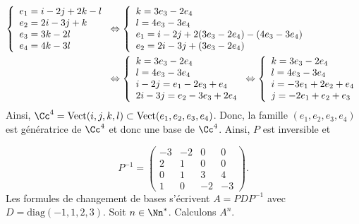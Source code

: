 {\begin{enumerate}
{\begin{align*}\ensuremath
\left\{
\begin{array}{l}
e_1=i-2j+2k-l\\
e_2=2i-3j+k\\
e_3=3k-2l\\
e_4=4k-3l
\end{array}
\right.
&\Leftrightarrow
\left\{
\begin{array}{l}
k=3e_3-2e_4\\
l=4e_3-3e_4\\
e_1=i-2j+2(3e_3-2e_4)-(4e_3-3e_4)\\
e_2=2i-3j+(3e_3-2e_4)
\end{array}
\right.
\\
 &\Leftrightarrow
\left\{
\begin{array}{l}
k=3e_3-2e_4\\
l=4e_3-3e_4\\
i-2j=e_1-2e_3+e_4\\
2i-3j=e_2-3e_3+2e_4
\end{array}
\right.\Leftrightarrow
\left\{
\begin{array}{l}
k=3e_3-2e_4\\
l=4e_3-3e_4\\
i=-3e_1+2e_2+e_4\\
j=-2e_1+e_2+e_3
\end{array}
\right.
\end{align*}
Ainsi, $\Cc^4=\mbox{Vect}(i,j,k,l)\subset\mbox{Vect}(e_1,e_2,e_3,e_4)$. Donc, la famille $(e_1,e_2,e_3,e_4)$ est génératrice de $\Cc^4$ et donc une base de $\Cc^4$. Ainsi, $P$ est inversible et 

$$P^{-1}=
\left(
\begin{array}{cccc}
-3&-2&0&0\\
2&1&0&0\\
0&1&3&4\\
1&0&-2&-3
\end{array}
\right)
.$$
Les formules de changement de bases s'écrivent $A=PDP^{-1}$ avec $D=\mbox{diag}(-1,1,2,3)$.
Soit $n\in\Nn^*$. Calculons $A^n$.

}
\end{enumerate}}
